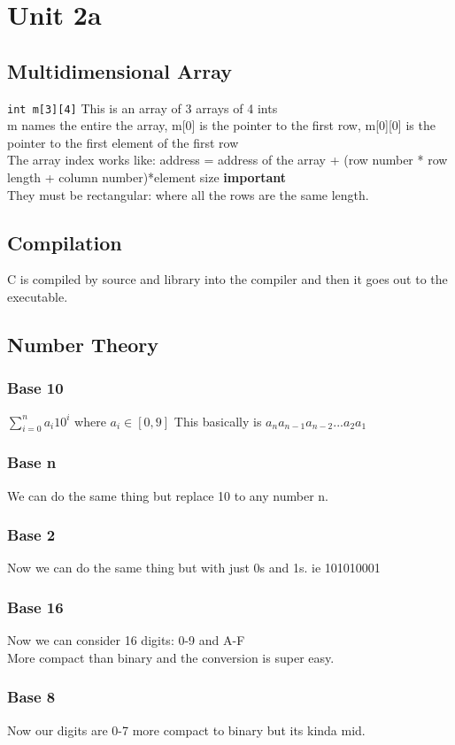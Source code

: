 \documentclass[answers,12pt,addpoints]{exam}
\begin{document}
\newpage
\section{Unit 2a}
\subsection{Multidimensional Array}
\texttt{int m[3][4]} This is an array of 3 arrays of 4 ints\\
m names the entire the array, m[0] is the pointer to the first row, m[0][0] is the pointer to the first element of the first row\\
The array index works like: address = address of the array + (row number * row length + column number)*element size \textbf{important}\\
They must be rectangular: where all the rows are the same length. 
\subsection{Compilation}
C is compiled by source and library into the compiler and then it goes out to the executable. 
\subsection{Number Theory}
\subsubsection{Base 10}
$\sum_{i = 0}^{n} a_i 10^i$ where $a_i \in [0,9]$
This basically is $a_n a_{n-1} a_{n-2} ... a_2 a_1$
\subsubsection{Base n }
We can do the same thing but replace 10 to any number n. 
\subsubsection{Base 2}
Now we can do the same thing but with just 0s and 1s. ie 101010001
\subsubsection{Base 16}
Now we can consider 16 digits: 0-9 and A-F\\
More compact than binary and the conversion is super easy.
\subsubsection{Base 8}
Now our digits are 0-7 more compact to binary but its kinda mid.
\end{document}
